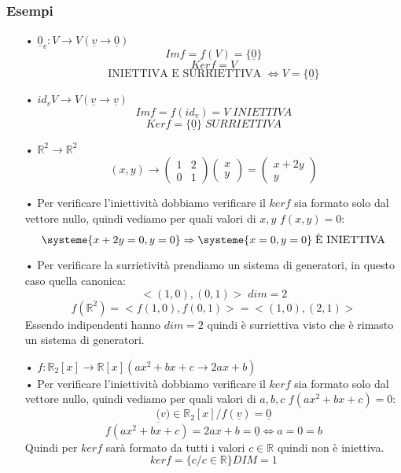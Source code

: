 \subsubsection{Esempi}
\begin{itemize}
\item[•] $\underline{0}_v: V \rightarrow V (\underline{v} \rightarrow \underline{0})$\\
$$ Im f = f(V) = \{\underline{0}\} $$
$$ Ker f = V$$ 
$$ \text{INIETTIVA E SURRIETTIVA } \Leftrightarrow V = \{\underline{0}\}$$

\item[•] $ id_v V \rightarrow V (\underline{v} \rightarrow \underline{v})  $
$$ Im f = f(id_v) = V \; INIETTIVA$$
$$ Ker f = \{\underline{0}\} \;  SURRIETTIVA$$

\item[•] $\mathbb{R}^2 \rightarrow \mathbb{R}^2$
$$ (x,y) \rightarrow \begin{pmatrix}1 & 2 \\ 0 & 1\end{pmatrix} \begin{pmatrix}x \\ y \end{pmatrix} = \begin{pmatrix}x+2y \\ y\end{pmatrix} $$

\subitem • Per verificare l'iniettività dobbiamo verificare il $ker f$ sia formato solo dal vettore nullo, quindi vediamo per quali valori di $x,y$ $f(x,y) = 0$:
$$ \systeme{x+2y=0, y=0} \Rightarrow \systeme{x=0,y=0} \; \text{È INIETTIVA} $$

\subitem • Per verificare la surrietività prendiamo un sistema di generatori, in questo caso quella canonica:
$$ <(1,0),(0,1)> \; dim=2$$
$$ f(\mathbb{R}^2) = <f(1,0),f(0,1)> = <(1,0),(2,1)>$$
Essendo indipendenti hanno $dim=2$ quindi è surriettiva visto che è rimasto un sistema di generatori.

\item[•] $f: \mathbb{R}_2[x] \rightarrow \mathbb{R}[x] (ax^2+bx+c \rightarrow 2ax+b)$\\

\subitem •  Per verificare l'iniettività dobbiamo verificare il $ker f$ sia formato solo dal vettore nullo, quindi vediamo per quali valori di $a,b,c$ $f(ax^2+bx+c) = 0$:
$$ \underline(v) \in \mathbb{R}_2[x] / f(\underline{v})= \underline{0}$$
$$ f(ax^2+bx+c) =  2ax+b = \underline{0} \Leftrightarrow a = 0 = b $$
Quindi per $ker f$ sarà formato da tutti i valori $c \in \mathbb{R}$ quindi non è iniettiva.
$$ ker f = \{c/c \in \mathbb{R}\} DIM=1$$


\end{itemize}

